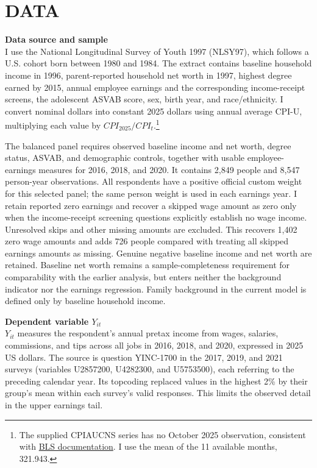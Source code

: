 \documentclass[12pt,letterpaper]{article}
\begin{document}
\section*{DATA}
\textbf{Data source and sample}\\
I use the National Longitudinal Survey of Youth 1997 (NLSY97), which follows a
U.S. cohort born between 1980 and 1984. The extract contains baseline household
income in 1996, parent-reported household net worth in 1997, highest degree earned
by 2015, annual employee earnings and the corresponding income-receipt screens,
the adolescent ASVAB score, sex, birth year, and race/ethnicity. I convert nominal dollars into constant 2025 dollars using annual average CPI-U,
multiplying each value by $CPI_{2025}/CPI_t$.\footnote{The supplied CPIAUCNS series
has no October 2025 observation, consistent with
\href{https://www.bls.gov/news.release/archives/cpi_12182025.htm}{BLS documentation}.
I use the mean of the 11 available months, 321.943.}\newline

The balanced panel requires observed baseline income and net worth, degree status,
ASVAB, and demographic controls, together with usable employee-earnings measures
for 2016, 2018, and 2020. It contains 2,849 people and 8,547 person-year observations.
All respondents have a positive official custom weight for this selected panel;
the same person weight is used in each earnings year. I retain reported zero earnings and
recover a skipped wage amount as zero only when the income-receipt screening
questions explicitly establish no wage income. Unresolved skips and other missing
amounts are excluded. This recovers 1,402 zero wage amounts and adds 726 people
compared with treating all skipped earnings amounts as missing. Genuine negative baseline income and net worth
are retained. Baseline net worth remains a sample-completeness requirement for
comparability with the earlier analysis, but enters neither the background indicator
nor the earnings regression. Family background in the current model is defined
only by baseline household income.\newline

\textbf{Dependent variable $Y_{it}$}\\
$Y_{it}$ measures the respondent's annual pretax income from wages, salaries,
commissions, and tips across all jobs in 2016, 2018, and 2020, expressed in 2025
US dollars. The source is question YINC-1700 in the 2017, 2019, and 2021 surveys
(variables U2857200, U4282300, and U5753500), each referring to the preceding
calendar year. Its topcoding replaced values in the highest 2\% by 
their group's mean within each survey's valid responses. This limits the
 observed detail in the upper earnings tail.\newline
\end{document}

